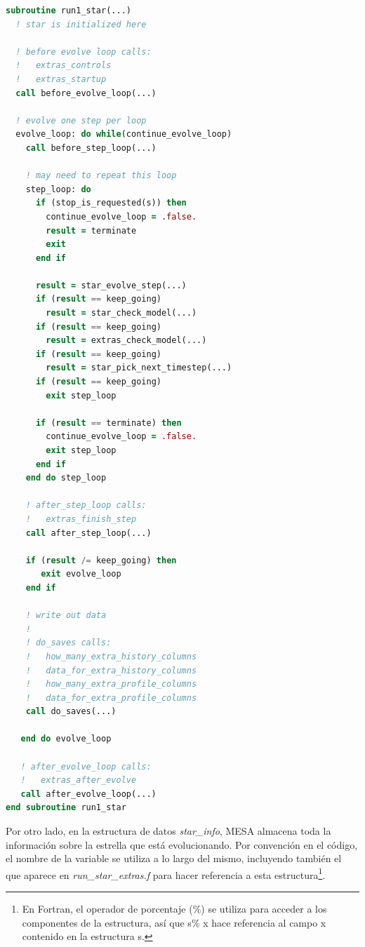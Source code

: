 \begin{lstlisting}[language=Fortran, float, caption={Bucle de control principal sobre el que itera MESA en cada paso temporal}, label={lst:bucle_ctrl}]
subroutine run1_star(...)
  ! star is initialized here

  ! before evolve loop calls:
  !   extras_controls
  !   extras_startup
  call before_evolve_loop(...)

  ! evolve one step per loop
  evolve_loop: do while(continue_evolve_loop)
    call before_step_loop(...)

    ! may need to repeat this loop
    step_loop: do 
      if (stop_is_requested(s)) then
        continue_evolve_loop = .false.
        result = terminate
        exit
      end if

      result = star_evolve_step(...)
      if (result == keep_going) 
        result = star_check_model(...)
      if (result == keep_going) 
        result = extras_check_model(...)
      if (result == keep_going)
        result = star_pick_next_timestep(...)
      if (result == keep_going) 
        exit step_loop

      if (result == terminate) then
        continue_evolve_loop = .false.
        exit step_loop
      end if
    end do step_loop

    ! after_step_loop calls:
    !   extras_finish_step
    call after_step_loop(...)

    if (result /= keep_going) then
       exit evolve_loop
    end if

    ! write out data
    !
    ! do_saves calls:
    !   how_many_extra_history_columns
    !   data_for_extra_history_columns
    !   how_many_extra_profile_columns
    !   data_for_extra_profile_columns
    call do_saves(...)

   end do evolve_loop

   ! after_evolve_loop calls:
   !   extras_after_evolve
   call after_evolve_loop(...)
end subroutine run1_star
\end{lstlisting}

Por otro lado, en la estructura de datos \textit{star\_info}, MESA almacena toda la información sobre la estrella que está evolucionando. Por convención en el código, el nombre de la variable se utiliza a lo largo del mismo, incluyendo también el que aparece en \textit{run\_star\_extras.f} para hacer referencia a esta estructura\footnote{En Fortran, el operador de porcentaje (\%) se utiliza para acceder a los componentes de la estructura, así que s\% x hace referencia al campo x contenido en la estructura s.}.\par

